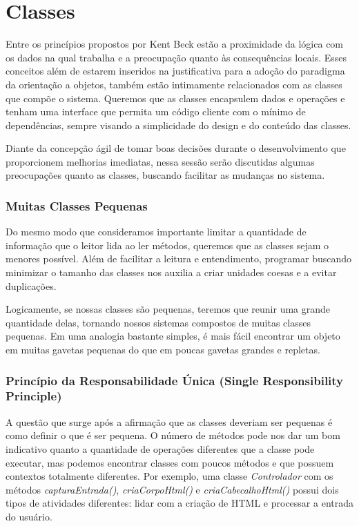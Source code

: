 \section{Classes}
\label{sec:classes}

Entre os princípios propostos por Kent Beck estão a proximidade da lógica com os dados na qual trabalha e a preocupação quanto às consequências locais. Esses conceitos além de estarem inseridos na justificativa para a adoção do paradigma da orientação a objetos, também estão intimamente relacionados com as classes que compõe o sistema. Queremos que as classes encapsulem dados e operações e tenham uma interface que permita um código cliente com o mínimo de dependências, sempre visando a simplicidade do design e do conteúdo das classes.
	
Diante da concepção ágil de tomar boas decisões durante o desenvolvimento que proporcionem melhorias imediatas, nessa sessão serão discutidas algumas preocupações quanto as classes, buscando facilitar as mudanças no sistema.

\subsubsection{Muitas Classes Pequenas}
Do mesmo modo que consideramos importante limitar a quantidade de informação que o leitor lida ao ler métodos, queremos que as classes sejam o menores possível. Além de facilitar a leitura e entendimento, programar buscando minimizar o tamanho das classes nos auxilia a criar unidades coesas e a evitar duplicações. 
	
Logicamente, se nossas classes são pequenas, teremos que reunir uma grande quantidade delas, tornando nossos sistemas compostos de muitas classes pequenas. Em uma analogia bastante simples, é mais fácil encontrar um objeto em muitas gavetas pequenas do que em poucas gavetas grandes e repletas.

\subsubsection{Princípio da Responsabilidade Única (Single Responsibility Principle)}
A questão que surge após a afirmação que as classes deveriam ser pequenas é como definir o que é ser pequena. O número de métodos pode nos dar um bom indicativo quanto a quantidade de operações diferentes que a classe pode executar, mas podemos encontrar classes com poucos métodos e que possuem contextos totalmente diferentes. Por exemplo, uma classe \textit{Controlador} com os métodos \textit{capturaEntrada()}, \textit{criaCorpoHtml()} e \textit{criaCabecalhoHtml()} possui dois tipos de atividades diferentes: lidar com a criação de HTML e processar a entrada do usuário.
	
